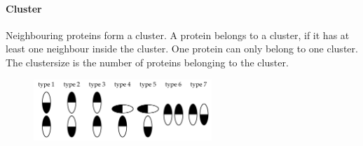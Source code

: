 \paragraph{Cluster} Neighbouring proteins form a cluster. A protein belongs to a cluster, if it has at least one neighbour inside the cluster. One protein can only belong to one cluster. The clustersize is the number of proteins belonging to the cluster.
%
%
%
\begin{figure}
	\centering
	\includegraphics[width=0.6\textwidth]{figures/introduction/classification}
	\label{methods:inttypes}
\end{figure}
%
%
%